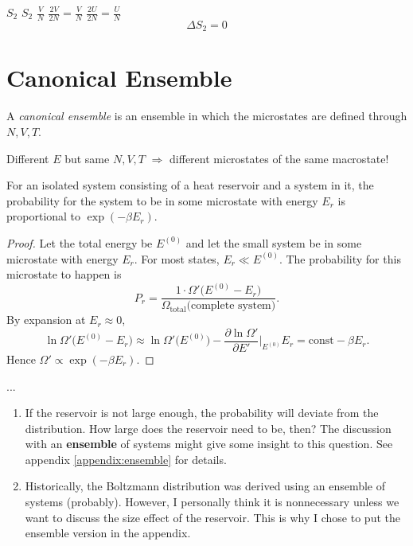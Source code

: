  $S_2$ 
 $S_2$  $\frac{V}{N}$ $\frac{2V}{2N} = \frac{V}{N}$  $\frac{2U}{2N} = \frac{U}{N}$ 
\[ \Delta S_{2} = 0 \]

\section{Canonical Ensemble}
\begin{definition}
A \emph{canonical ensemble} is an ensemble in which the microstates are defined through $N,V,T$.
\end{definition}

Different $E$ but same $N,V,T$ $\Longrightarrow$ different microstates of the same macrostate!

\begin{theorem}
For an isolated system consisting of a heat reservoir and a system in it, the probability for the system to be in some microstate with energy $E_r$ is proportional to $\exp(-\beta E_r)$.
\end{theorem}

\begin{proof}
Let the total energy be $E^{(0)}$ and let the small system be in some microstate with energy $E_r$. For most states, $E_r \ll E^{(0)}$. The probability for this microstate to happen is
\[
    P_r = \frac{1\cdot\Omega'\!\bigl(E^{(0)} - E_r\bigr)}{\Omega_{\mathrm{total}}\text{(complete system)}}.
\]
By expansion at $E_r \approx 0$,
\[
    \ln\Omega'\!\bigl(E^{(0)} - E_r\bigr)
    \approx \ln\Omega'\!\bigl(E^{(0)}\bigr)
    - \frac{\partial\ln\Omega'}{\partial E'}\bigg|_{E^{(0)}}\!E_r
    = \mathrm{const} - \beta E_r.
\]
Hence $\Omega' \propto \exp(-\beta E_r)$.
\end{proof}

\begin{remark}
    ...
    \begin{enumerate}
        \item If the reservoir is not large enough, the probability will deviate from the distribution. How large does the reservoir need to be, then? 
        The discussion with an \textbf{ensemble} of systems might give some insight to this question. See appendix \ref{appendix:ensemble} for details.
        \item Historically, the Boltzmann distribution was derived using an ensemble of systems (probably). However, I personally think it is nonnecessary unless 
        we want to discuss the size effect of the reservoir. This is why I chose to put the ensemble version in the appendix. 
    \end{enumerate}
\end{remark}

